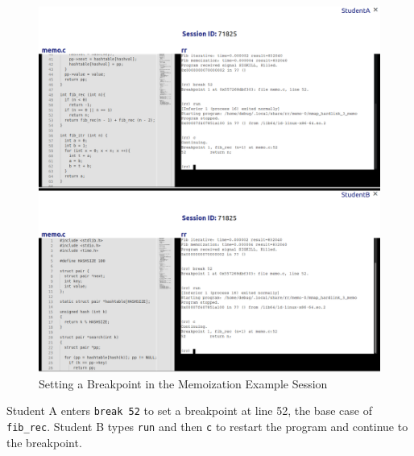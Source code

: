 \documentclass[12pt]{article}
\begin{document}
\begin{figure}[h!]

  \includegraphics[width=\textwidth]{session4i}
  \centering
  \caption{Setting a Breakpoint in the Memoization Example Session}
  \label{session4i}
\end{figure}

Student A enters \lstinline{break 52} to set a breakpoint at line 52,
the base case of \lstinline{fib_rec}.  Student B types \lstinline{run}
and then \lstinline{c} to restart the program and continue to the
breakpoint.\pagebreak
\end{document}
